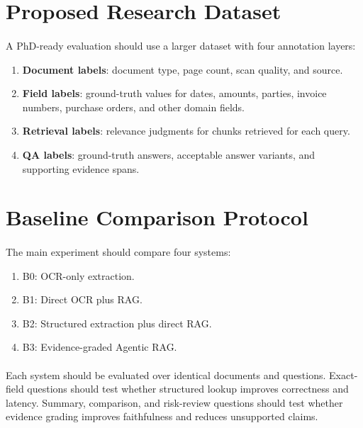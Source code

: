 \section{Proposed Research Dataset}
\paragraph{} A PhD-ready evaluation should use a larger dataset with four annotation layers:

\begin{enumerate}
    \item \textbf{Document labels}: document type, page count, scan quality, and source.
    \item \textbf{Field labels}: ground-truth values for dates, amounts, parties, invoice numbers, purchase orders, and other domain fields.
    \item \textbf{Retrieval labels}: relevance judgments for chunks retrieved for each query.
    \item \textbf{QA labels}: ground-truth answers, acceptable answer variants, and supporting evidence spans.
\end{enumerate}

\section{Baseline Comparison Protocol}
\paragraph{} The main experiment should compare four systems:

\begin{enumerate}
    \item B0: OCR-only extraction.
    \item B1: Direct OCR plus RAG.
    \item B2: Structured extraction plus direct RAG.
    \item B3: Evidence-graded Agentic RAG.
\end{enumerate}

\paragraph{} Each system should be evaluated over identical documents and questions. Exact-field questions should test whether structured lookup improves correctness and latency. Summary, comparison, and risk-review questions should test whether evidence grading improves faithfulness and reduces unsupported claims.

